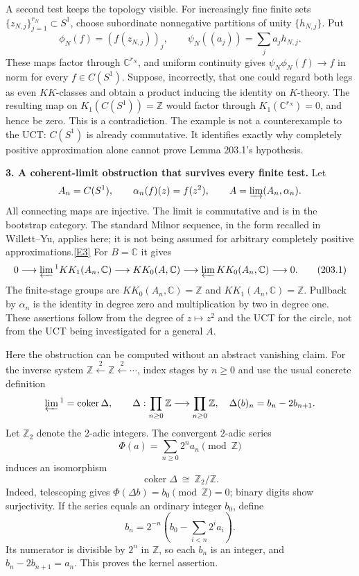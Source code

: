 \documentclass[11pt,a4paper]{article}
\newcommand{\Z}{\mathbb{Z}}
\newcommand{\C}{\mathbb{C}}
\newcommand{\eref}[2]{\hyperlink{extra:#1:#2}{[E#2]}}
\begin{document}
A second test keeps the topology visible. For increasingly fine finite
sets $\{z_{N,j}\}_{j=1}^{r_N}\subset S^1$, choose subordinate nonnegative
partitions of unity $\{h_{N,j}\}$. Put
\[
 \phi_N(f)=(f(z_{N,j}))_j,\qquad
 \psi_N((a_j))=\sum_j a_jh_{N,j}.
\]
These maps factor through $\C^{r_N}$, and uniform continuity gives
$\psi_N\phi_N(f)\to f$ in norm for every $f\in C(S^1)$.
Suppose, incorrectly, that one could regard both legs as even
$KK$-classes and obtain a product inducing the identity on $K$-theory.
The resulting map on $K_1(C(S^1))=\Z$ would factor through
$K_1(\C^{r_N})=0$, and hence be zero. This is a contradiction.
The example is not a counterexample to the UCT: $C(S^1)$ is already
commutative. It identifies exactly why completely positive approximation
alone cannot prove Lemma 203.1's hypothesis.

\textbf{3. A coherent-limit obstruction that survives every finite test.}
Let
\[
 A_n=C(S^1),\qquad \alpha_n(f)(z)=f(z^2),\qquad
 A=\varinjlim(A_n,\alpha_n).
\]
All connecting maps are injective. The limit is commutative and is in the
bootstrap category. The standard Milnor sequence, in the form recalled
in Willett--Yu, applies here; it is not being assumed for arbitrary
completely positive approximations.\eref{203}{3}
For $B=\C$ it gives
\[
 0\longrightarrow\varprojlim{}^{1} KK_1(A_n,\C)
 \longrightarrow KK_0(A,\C)
 \longrightarrow\varprojlim KK_0(A_n,\C)\longrightarrow0.
 \tag{203.1}
\]
The finite-stage groups are $KK_0(A_n,\C)=\Z$ and
$KK_1(A_n,\C)=\Z$. Pullback by $\alpha_n$ is the identity in degree zero
and multiplication by two in degree one. These assertions follow from
the degree of $z\mapsto z^2$ and the UCT for the circle, not from the UCT
being investigated for a general $A$.

Here the obstruction can be computed without an abstract vanishing
claim. For the inverse system $\Z\xleftarrow{2}\Z\xleftarrow{2}\cdots$,
index stages by $n\ge0$ and use the usual concrete definition
\[
 \varprojlim{}^{1}=\operatorname{coker}\Delta,\qquad
 \Delta:\prod_{n\ge0}\Z\longrightarrow\prod_{n\ge0}\Z,
 \quad\Delta(b)_n=b_n-2b_{n+1}.
\]
Let $\Z_2$ denote the $2$-adic integers. The convergent $2$-adic series
\[
 \Phi(a)=\sum_{n\ge0}2^n a_n\pmod{\Z}
\]
induces an isomorphism
\[
 \operatorname{coker}\Delta\ \cong\ \Z_2/\Z. \tag{203.2}
\]
Indeed, telescoping gives $\Phi(\Delta b)=b_0\pmod\Z=0$; binary digits
show surjectivity. If the series equals an ordinary integer $b_0$, define
\[
 b_n=2^{-n}\left(b_0-\sum_{i<n}2^ia_i\right).
\]
Its numerator is divisible by $2^n$ in $\Z$, so each $b_n$ is an integer,
and $b_n-2b_{n+1}=a_n$. This proves the kernel assertion.
\end{document}
